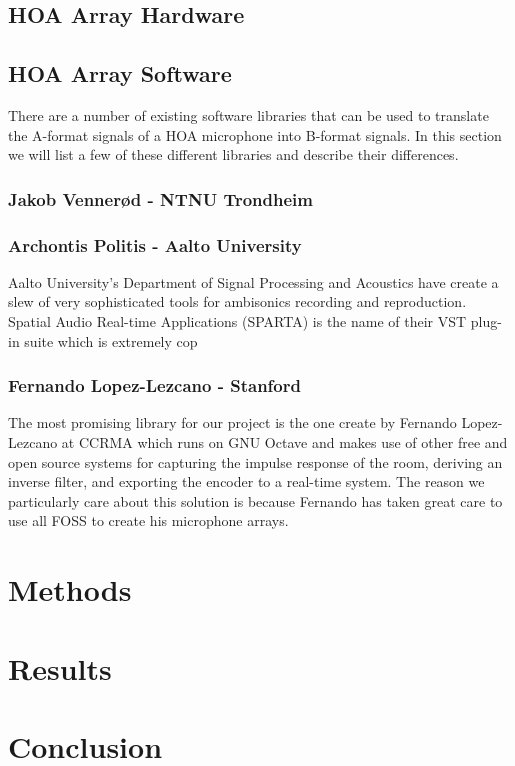 \subsection{HOA Array Hardware}

\subsection{HOA Array Software}
There are a number of existing software libraries that can be used to translate the A-format signals of a HOA microphone into B-format signals. In this section we will list a few of these different libraries and describe their differences.

\subsubsection{Jakob Vennerød - NTNU Trondheim}

\subsubsection{Archontis Politis - Aalto University}
Aalto University's Department of Signal Processing and Acoustics have create a slew of very sophisticated tools for ambisonics recording and reproduction. Spatial Audio Real-time Applications (SPARTA) is the name of their VST plug-in suite which is extremely cop

\subsubsection{Fernando Lopez-Lezcano - Stanford}
The most promising library for our project is the one create by Fernando Lopez-Lezcano at CCRMA which runs on GNU Octave and makes use of other free and open source systems for capturing the impulse response of the room, deriving an inverse filter, and exporting the encoder to a real-time system. The reason we particularly care about this solution is because Fernando has taken great care to use all FOSS to create his microphone arrays. 

\section{Methods}

\section{Results}

\section{Conclusion}
